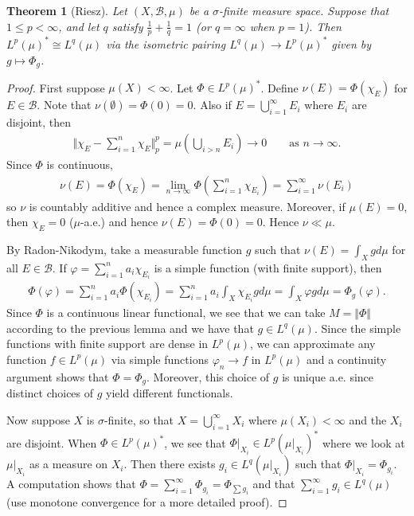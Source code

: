 \documentclass[11pt]{amsart}
\newtheorem{theorem}{Theorem}[section]
\theoremstyle{definition}
\numberwithin{equation}{section}
\begin{document}
\begin{theorem}[Riesz]
    Let $(X,\mathcal B,\mu)$ be a $\sigma$-finite measure space. Suppose that $1\le p<\infty$, and let $q$ satisfy $\frac{1}{p}+\frac{1}{q}=1$ (or $q=\infty$ when $p=1$). Then $L^p(\mu)^*\cong L^q(\mu)$ via the isometric pairing $L^q(\mu)\to L^p(\mu)^*$ given by $g\mapsto \Phi_g$.
\end{theorem}
\begin{proof}
    First suppose $\mu(X)<\infty$. Let $\Phi\in L^p(\mu)^*$. Define $\nu(E)=\Phi(\chi_E)$ for $E\in\mathcal B$. Note that $\nu(\emptyset)=\Phi(0)=0$. Also if $E=\bigcup_{i=1}^\infty E_i$ where $E_i$ are disjoint, then 
    \begin{align*}
        \Vert\chi_E-\sum_{i=1}^n\chi_E\Vert_p^p=\mu(\bigcup_{i>n} E_i)\to 0\qquad\text{as }n\to\infty.
    \end{align*}
    Since $\Phi$ is continuous, 
    \begin{align*}
        \nu(E)=\Phi(\chi_E)=\lim_{n\to\infty}\Phi(\sum_{i=1}^n\chi_{E_i})=\sum_{i=1}^\infty\nu(E_i)
    \end{align*}
    so $\nu$ is countably additive and hence a complex measure. Moreover, if $\mu(E)=0$, then $\chi_E=0$ ($\mu$-a.e.) and hence $\nu(E)=\Phi(0)=0$. Hence $\nu\ll\mu$.

    By Radon-Nikodym, take a measurable function $g$ such that $\nu(E)=\int_Xgd\mu$ for all $E\in\mathcal B$. If $\varphi=\sum_{i=1}^na_i\chi_{E_i}$ is a simple function (with finite support), then 
    \begin{align*}
        \Phi(\varphi)=\sum_{i=1}^na_i\Phi(\chi_{E_i})=\sum_{i=1}^na_i\int_X\chi_{E_i}gd\mu=\int_X\varphi gd\mu=\Phi_g(\varphi).
    \end{align*}
    Since $\Phi$ is a continuous linear functional, we see that we can take $M=\Vert\Phi\Vert$ according to the previous lemma and we have that $g\in L^q(\mu)$. Since the simple functions with finite support are dense in $L^p(\mu)$, we can approximate any function $f\in L^p(\mu)$ via simple functions $\varphi_n\to f$ in $L^p(\mu)$ and a continuity argument shows that $\Phi=\Phi_g$. Moreover, this choice of $g$ is unique a.e. since distinct choices of $g$ yield different functionals.

    Now suppose $X$ is $\sigma$-finite, so that $X=\bigcup_{i=1}^\infty X_i$ where $\mu(X_i)<\infty$ and the $X_i$ are disjoint. When $\Phi\in L^p(\mu)^*$, we see that $\Phi|_{X_i}\in L^p(\mu|_{X_i})^*$ where we look at $\mu|_{X_i}$ as a measure on $X_i$. Then there exists $g_i\in L^q(\mu|_{X_i})$ such that $\Phi|_{X_i}=\Phi_{g_i}$. A computation shows that $\Phi=\sum_{i=1}^\infty\Phi_{g_i}=\Phi_{\sum g_i}$ and that $\sum_{i=1}^\infty g_i\in L^q(\mu)$ (use monotone convergence for a more detailed proof). 
\end{proof}
\newpage
\end{document}

